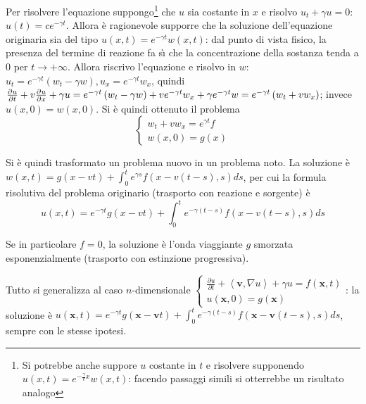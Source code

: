 \documentclass{article}
\begin{document}
Per risolvere l'equazione suppongo\footnote{%
Si potrebbe anche suppore $u$ costante in $t$ e risolvere supponendo $%
u\left( x,t\right) =e^{-\frac{\gamma }{v}x}w\left( x,t\right) $: facendo
passaggi simili si otterrebbe un risultato analogo} che $u$ sia costante in $%
x$ e risolvo $u_{t}+\gamma u=0$: $u\left( t\right) =ce^{-\gamma t}$. Allora 
\`{e} ragionevole supporre che la soluzione dell'equazione originaria sia
del tipo $u\left( x,t\right) =e^{-\gamma t}w\left( x,t\right) $: dal punto
di vista fisico, la presenza del termine di reazione fa s\`{\i} che la
concentrazione della sostanza tenda a $0$ per $t\rightarrow +\infty $.
Allora riscrivo l'equazione e risolvo in $w$: $u_{t}=e^{-\gamma t}\left(
w_{t}-\gamma w\right) ,u_{x}=e^{-\gamma t}w_{x}$, quindi $\frac{\partial u}{%
\partial t}+v\frac{\partial u}{\partial x}+\gamma u=e^{-\gamma t}\left(
w_{t}-\gamma w\right) +ve^{-\gamma t}w_{x}+\gamma e^{-\gamma t}w=e^{-\gamma
t}\left( w_{t}+vw_{x}\right) $; invece $u\left( x,0\right) =w\left(
x,0\right) $. Si \`{e} quindi ottenuto il problema%
\begin{equation*}
\left\{ 
\begin{array}{c}
w_{t}+vw_{x}=e^{\gamma t}f \\ 
w\left( x,0\right) =g\left( x\right)%
\end{array}%
\right.
\end{equation*}

Si \`{e} quindi trasformato un problema nuovo in un problema noto. La
soluzione \`{e} $w\left( x,t\right) =g\left( x-vt\right)
+\int_{0}^{t}e^{\gamma s}f\left( x-v\left( t-s\right) ,s\right) ds$, per cui
la formula risolutiva del problema originario (trasporto con reazione e
sorgente) \`{e}%
\begin{equation*}
u\left( x,t\right) =e^{-\gamma t}g\left( x-vt\right) +\int_{0}^{t}e^{-\gamma
\left( t-s\right) }f\left( x-v\left( t-s\right) ,s\right) ds
\end{equation*}

Se in particolare $f=0$, la soluzione \`{e} l'onda viaggiante $g$ smorzata
esponenzialmente (trasporto con estinzione progressiva).

Tutto si generalizza al caso $n$-dimensionale $\left\{ 
\begin{array}{c}
\frac{\partial u}{\partial t}+\left\langle \mathbf{v},\nabla u\right\rangle
+\gamma u=f\left( \mathbf{x},t\right) \\ 
u\left( \mathbf{x},0\right) =g\left( \mathbf{x}\right)%
\end{array}%
\right. $: la soluzione \`{e} $u\left( \mathbf{x},t\right) =e^{-\gamma
t}g\left( \mathbf{x-v}t\right) +\int_{0}^{t}e^{-\gamma \left( t-s\right)
}f\left( \mathbf{x-v}\left( t-s\right) ,s\right) ds$, sempre con le stesse
ipotesi.
\end{document}
